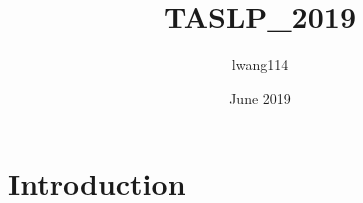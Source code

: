 \documentclass{article}
\title{TASLP_2019}
\author{lwang114 }
\date{June 2019}
\begin{document}
\maketitle

\section{Introduction}
\end{document}
